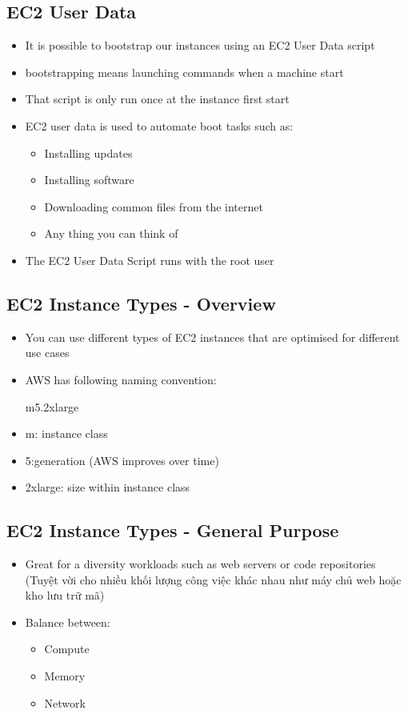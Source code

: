 \subsection{EC2 User Data}


\begin{itemize}
	\item It is possible to bootstrap our instances using an EC2 User Data script
	\item bootstrapping means launching commands when a machine start
	\item That script is only run once at the instance first start 
	\item EC2 user data is used to automate boot tasks such as: 
	\begin{itemize}
		\item Installing updates
		\item Installing software
		\item Downloading common files from the internet
		\item Any thing you can think of
	\end{itemize}
	\item The EC2 User Data Script runs with the root user
\end{itemize}


\subsection{EC2 Instance Types - Overview}

\begin{itemize}
	\item You can use different types of EC2 instances that are optimised  for different use cases
	\item AWS has following naming convention:
	\begin{center}
		m5.2xlarge
	\end{center} 
	\item m: instance class
	\item 5:generation (AWS improves over time)
	\item 2xlarge: size within instance class
\end{itemize}


\subsection{EC2 Instance Types - General Purpose}

\begin{itemize}
	\item Great for a diversity workloads such as web servers or code repositories (Tuyệt vời cho nhiều khối lượng công việc khác nhau như máy chủ web hoặc kho lưu trữ mã)
	\item Balance between:
	\begin{itemize}
		\item Compute
		\item Memory
		\item Network
	\end{itemize}
\end{itemize}

